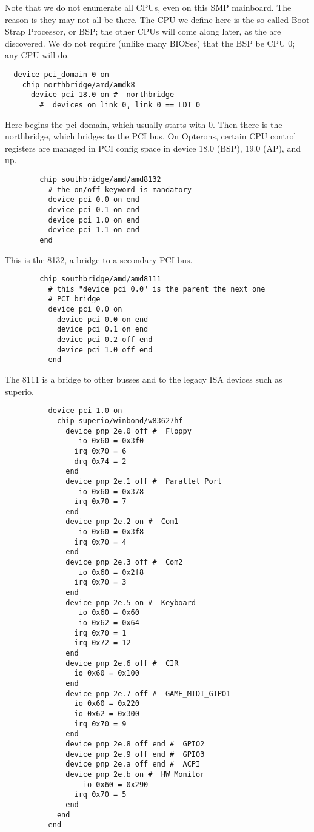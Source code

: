 \documentclass[10pt,letterpaper]{article}
\begin{document}
Note that we do not enumerate all CPUs, even on this SMP mainboard. The reason is they may not all be there. The CPU we define here
is the so-called Boot Strap Processor, or BSP; the other CPUs will come along later, as the are discovered. We do not require (unlike many
BIOSes) that the BSP be CPU 0; any CPU will do.
\begin{verbatim}
  device pci_domain 0 on
    chip northbridge/amd/amdk8
      device pci 18.0 on #  northbridge
        #  devices on link 0, link 0 == LDT 0
\end{verbatim}
Here begins the pci domain, which usually starts with 0. Then there is the northbridge, which bridges to the PCI bus. On
Opterons, certain CPU control registers are managed in PCI config space in device 18.0 (BSP), 19.0 (AP), and up.
\begin{verbatim}
        chip southbridge/amd/amd8132
          # the on/off keyword is mandatory
          device pci 0.0 on end
          device pci 0.1 on end
          device pci 1.0 on end
          device pci 1.1 on end
        end
\end{verbatim}
This is the 8132, a bridge to a secondary PCI bus.
\begin{verbatim}
        chip southbridge/amd/amd8111
          # this "device pci 0.0" is the parent the next one
          # PCI bridge
          device pci 0.0 on
            device pci 0.0 on end
            device pci 0.1 on end
            device pci 0.2 off end
            device pci 1.0 off end
          end
\end{verbatim}
The 8111 is a bridge to other busses and to the legacy ISA devices such as superio.
\begin{verbatim}
          device pci 1.0 on
            chip superio/winbond/w83627hf
              device pnp 2e.0 off #  Floppy
                 io 0x60 = 0x3f0
                irq 0x70 = 6
                drq 0x74 = 2
              end
              device pnp 2e.1 off #  Parallel Port
                 io 0x60 = 0x378
                irq 0x70 = 7
              end
              device pnp 2e.2 on #  Com1
                 io 0x60 = 0x3f8
                irq 0x70 = 4
              end
              device pnp 2e.3 off #  Com2
                 io 0x60 = 0x2f8
                irq 0x70 = 3
              end
              device pnp 2e.5 on #  Keyboard
                 io 0x60 = 0x60
                 io 0x62 = 0x64
                irq 0x70 = 1
                irq 0x72 = 12
              end
              device pnp 2e.6 off #  CIR
                io 0x60 = 0x100
              end
              device pnp 2e.7 off #  GAME_MIDI_GIPO1
                io 0x60 = 0x220
                io 0x62 = 0x300
                irq 0x70 = 9
              end
              device pnp 2e.8 off end #  GPIO2
              device pnp 2e.9 off end #  GPIO3
              device pnp 2e.a off end #  ACPI
              device pnp 2e.b on #  HW Monitor
                  io 0x60 = 0x290
                irq 0x70 = 5
              end
            end
          end
\end{verbatim}
\end{document}
